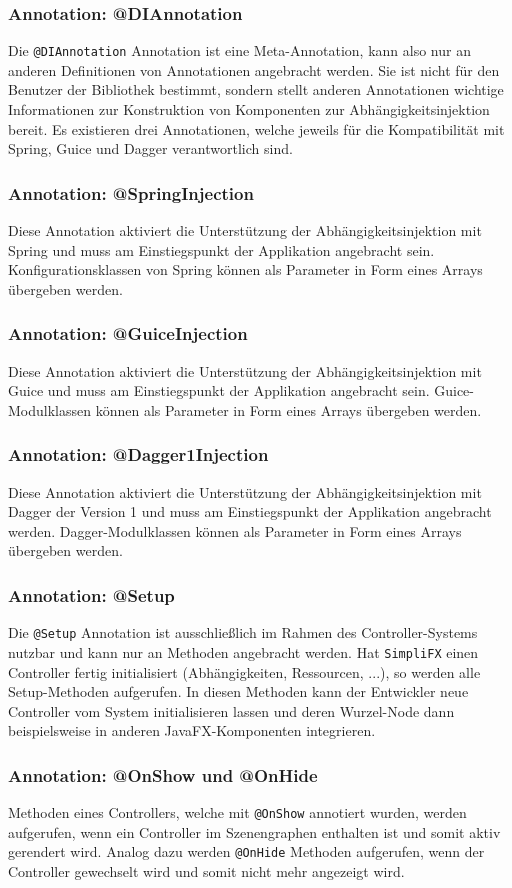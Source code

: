 \subsubsection{Annotation: @DIAnnotation}
Die \texttt{@DIAnnotation} Annotation ist eine Meta-Annotation, kann also nur an anderen Definitionen von Annotationen angebracht werden. Sie ist nicht für den Benutzer der Bibliothek bestimmt, sondern stellt anderen Annotationen wichtige Informationen zur Konstruktion von Komponenten zur Abhängigkeitsinjektion bereit. Es existieren drei Annotationen, welche jeweils für die Kompatibilität mit Spring, Guice und Dagger verantwortlich sind.
\subsubsection{Annotation: @SpringInjection}
Diese Annotation aktiviert die Unterstützung der Abhängigkeitsinjektion mit Spring und muss am Einstiegspunkt der Applikation angebracht sein. Konfigurationsklassen von Spring können als Parameter in Form eines Arrays übergeben werden.
\subsubsection{Annotation: @GuiceInjection}
Diese Annotation aktiviert die Unterstützung der Abhängigkeitsinjektion mit Guice und muss am Einstiegspunkt der Applikation angebracht sein. Guice-Modulklassen können als Parameter in Form eines Arrays übergeben werden.
\subsubsection{Annotation: @Dagger1Injection}
Diese Annotation aktiviert die Unterstützung der Abhängigkeitsinjektion mit Dagger der Version 1 und muss am Einstiegspunkt der Applikation angebracht werden. Dagger-Modulklassen können als Parameter in Form eines Arrays übergeben werden.
\subsubsection{Annotation: @Setup}
Die \texttt{@Setup} Annotation ist ausschließlich im Rahmen des Controller-Systems nutzbar und kann nur an Methoden angebracht werden. Hat \texttt{SimpliFX} einen Controller fertig initialisiert (Abhängigkeiten, Ressourcen, ...), so werden alle Setup-Methoden aufgerufen. In diesen Methoden kann der Entwickler neue Controller vom System initialisieren lassen und deren Wurzel-Node dann beispielsweise in anderen JavaFX-Komponenten integrieren.
\subsubsection{Annotation: @OnShow und @OnHide}
Methoden eines Controllers, welche mit \texttt{@OnShow} annotiert wurden, werden aufgerufen, wenn ein Controller im Szenengraphen enthalten ist und somit aktiv gerendert wird. Analog dazu werden \texttt{@OnHide} Methoden aufgerufen, wenn der Controller gewechselt wird und somit nicht mehr angezeigt wird.
